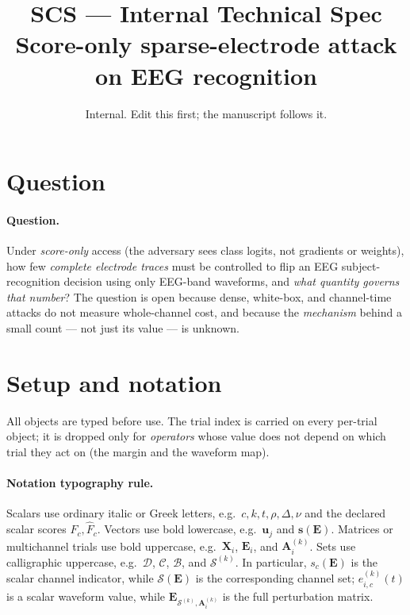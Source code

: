 \documentclass[11pt]{article}
\title{\textbf{SCS --- Internal Technical Spec}\\[2pt]
\large Score-only sparse-electrode attack on EEG recognition}
\author{}
\date{Internal. Edit this first; the manuscript follows it.}
\begin{document}
\maketitle
\vspace{-3em}

\section{Question}

\paragraph{Question.} Under \emph{score-only} access (the adversary sees class
logits, not gradients or weights), how few \emph{complete electrode traces} must be
controlled to flip an EEG subject-recognition decision using only EEG-band waveforms,
and \emph{what quantity governs that number}? The question is open because dense,
white-box, and channel-time attacks do not measure whole-channel cost, and because the
\emph{mechanism} behind a small count --- not just its value --- is unknown.

\section{Setup and notation}

All objects are typed before use. The trial index is carried on every per-trial
object; it is dropped only for \emph{operators} whose value does not depend on which
trial they act on (the margin and the waveform map).

\paragraph{Notation typography rule.}
Scalars use ordinary italic or Greek letters, e.g.\ $c,k,t,\rho,\Delta,\nu$ and the
declared scalar scores $F_c,\widehat F_c$. Vectors use bold lowercase, e.g.\
$\mathbf{u}_j$ and $\mathbf{s}(\mathbf{E})$. Matrices or multichannel trials use bold
uppercase, e.g.\ $\mathbf{X}_i$, $\mathbf{E}_i$, and $\mathbf{A}_i^{(k)}$. Sets use
calligraphic uppercase, e.g.\ $\mathcal{D}$, $\mathcal{C}$, $\mathcal{B}$, and
$\mathcal{S}^{(k)}$. In particular, $s_c(\mathbf{E})$ is the scalar channel indicator,
while $\mathcal{S}(\mathbf{E})$ is the corresponding channel set; $e_{i,c}^{(k)}(t)$ is
a scalar waveform value, while $\mathbf{E}_{\mathcal{S}^{(k)},\mathbf{A}_i^{(k)}}$ is the
full perturbation matrix.
\end{document}
